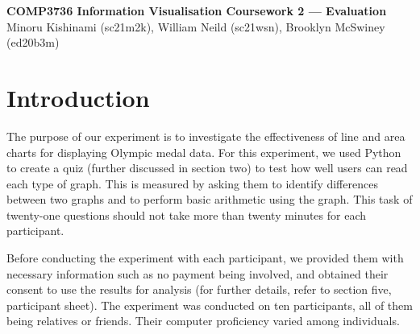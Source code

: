 
\begin{flushleft}
    \textbf{\large COMP3736 Information Visualisation Coursework 2 --- Evaluation}\\
    Minoru Kishinami (sc21m2k), William Neild (sc21wsn), Brooklyn McSwiney (ed20b3m)\\
\end{flushleft}
\section{Introduction}

\begin{flushleft}
    \quad The purpose of our experiment is to investigate the effectiveness of line and area charts for displaying Olympic medal data.
    For this experiment, we used Python to create a quiz (further discussed in section two) to test how well users can read
    each type of graph. This is measured by asking them to identify differences between two graphs and to perform basic arithmetic
    using the graph. This task of twenty-one questions should not take more than twenty minutes for each participant.
    
    \quad Before conducting the experiment with each participant, we provided them with necessary information such as no payment being involved, and obtained their consent to use the results for analysis (for further details, refer to section five, participant sheet). The experiment was conducted on ten participants, all of them being relatives or friends. Their computer proficiency varied among individuals. 
\end{flushleft}


